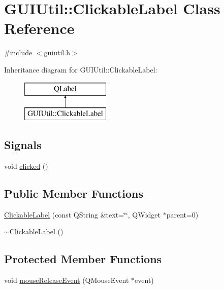 \hypertarget{class_g_u_i_util_1_1_clickable_label}{}\section{G\+U\+I\+Util\+:\+:Clickable\+Label Class Reference}
\label{class_g_u_i_util_1_1_clickable_label}


{\ttfamily \#include $<$guiutil.\+h$>$}

Inheritance diagram for G\+U\+I\+Util\+:\+:Clickable\+Label\+:\begin{figure}[H]
\begin{center}
\leavevmode
\includegraphics[height=2.000000cm]{class_g_u_i_util_1_1_clickable_label}
\end{center}
\end{figure}
\subsection*{Signals}
\begin{DoxyCompactItemize}
\item 
void \hyperlink{class_g_u_i_util_1_1_clickable_label_a6606940e3d7d916db187a9e89a0b7844}{clicked} ()
\end{DoxyCompactItemize}
\subsection*{Public Member Functions}
\begin{DoxyCompactItemize}
\item 
\hyperlink{class_g_u_i_util_1_1_clickable_label_a10c4a2a17cf216e9a1ba27389e827a82}{Clickable\+Label} (const Q\+String \&text=\char`\"{}\char`\"{}, Q\+Widget $\ast$parent=0)
\item 
\hyperlink{class_g_u_i_util_1_1_clickable_label_a54d1792cc5ea7c57f630328b84cfbe59}{$\sim$\+Clickable\+Label} ()
\end{DoxyCompactItemize}
\subsection*{Protected Member Functions}
\begin{DoxyCompactItemize}
\item 
void \hyperlink{class_g_u_i_util_1_1_clickable_label_a5bd4929d11bc3a714b55527d38e928fe}{mouse\+Release\+Event} (Q\+Mouse\+Event $\ast$event)
\end{DoxyCompactItemize}


